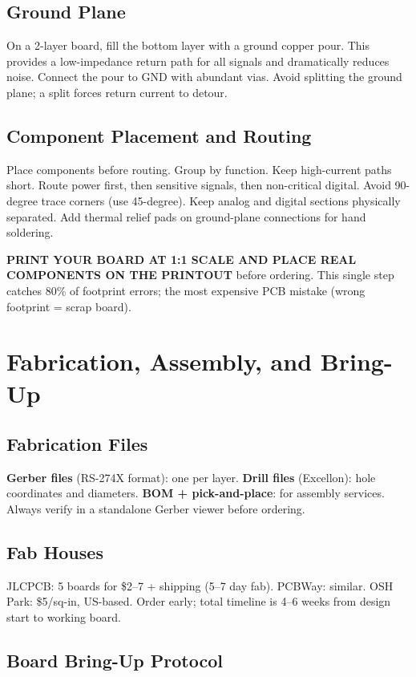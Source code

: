 \documentclass[11pt,letterpaper,twoside,openany]{book}
\begin{document}
\subsection{Ground Plane}
On a 2-layer board, fill the bottom layer with a ground copper pour. This provides a low-impedance return path for all signals and dramatically reduces noise. Connect the pour to GND with abundant vias. Avoid splitting the ground plane; a split forces return current to detour.

\subsection{Component Placement and Routing}
Place components before routing. Group by function. Keep high-current paths short. Route power first, then sensitive signals, then non-critical digital. Avoid 90-degree trace corners (use 45-degree). Keep analog and digital sections physically separated. Add thermal relief pads on ground-plane connections for hand soldering.

\begin{tipbox}
\textbf{PRINT YOUR BOARD AT 1:1 SCALE AND PLACE REAL COMPONENTS ON THE PRINTOUT} before ordering. This single step catches 80\% of footprint errors; the most expensive PCB mistake (wrong footprint = scrap board).
\end{tipbox}

\section{Fabrication, Assembly, and Bring-Up}

\subsection{Fabrication Files}
\textbf{Gerber files} (RS-274X format): one per layer. \textbf{Drill files} (Excellon): hole coordinates and diameters. \textbf{BOM + pick-and-place}: for assembly services. Always verify in a standalone Gerber viewer before ordering.

\subsection{Fab Houses}
JLCPCB: 5 boards for \$2--7 + shipping (5--7 day fab). PCBWay: similar. OSH Park: \$5/sq-in, US-based. Order early; total timeline is 4--6 weeks from design start to working board.

\subsection{Board Bring-Up Protocol}
\end{document}
